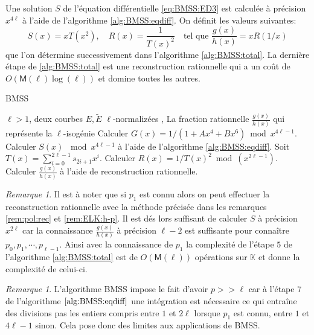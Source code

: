 \documentclass[10pt,a4paper]{book}
\theoremstyle{plain}
\theoremstyle{definition}
\theoremstyle{definition}
\theoremstyle{definition}
\theoremstyle{definition}
\theoremstyle{remark}
\newtheorem{rem}[thm]{Remarque}
\theoremstyle{remark}
\begin{document}
Une solution $S$ de l'équation différentielle \eqref{eq:BMSS:ED3} est calculée à précision $x^{4\ell}$ à l'aide de l'algorithme \ref{alg:BMSS:eqdiff}. On définit les valeurs suivantes:
\begin{equation}
S(x)=xT(x^2), \quad R(x)=\frac{1}{T(x)^2} \quad \text{tel que } \frac{g(x)}{h(x)}=xR(1/x)
\end{equation}
que l'on détermine successivement dans l'algorithme \ref{alg:BMSS:total}. La dernière étape de \ref{alg:BMSS:total} est une reconstruction rationnelle qui a un coût de $O(\mathsf{M}(\ell)\log(\ell))$ \cite[11]{vzGJG03} et domine toutes les autres.

\begin{algorithm}
\caption{\label{alg:BMSS:total} BMSS}
\begin{algorithmic}[1]
\REQUIRE $\ell>1$, deux courbes $E,\tilde{E}$ $\ell$-normalizées  ,%
\ENSURE La fraction rationnelle $\frac{g(x)}{h(x)}$ qui représente la $\ell$-isogénie
\STATE Calculer $G(x)=1/(1+Ax^4+Bx^6) \bmod x^{4\ell-1}$.
\STATE Calculer $S(x)$ $\bmod x^{4\ell-1}$ à l'aide de l'algorithme \ref{alg:BMSS:eqdiff}.
\STATE Soit $T(x)=\sum_{i=0}^{2\ell-1}s_{2i+1}x^i$.
\STATE Calculer $R(x)=1/T(x)^2 \bmod(x^{2\ell-1})$.
\STATE Calculer $\frac{g(x)}{h(x)}$ à l'aide de reconstruction rationnelle. 
\end{algorithmic}
\end{algorithm}

\begin{rem}
Il est à noter que si $p_1$ est connu alors on peut effectuer la reconstruction rationnelle avec la méthode  précisée dans les remarques \ref{rem:pol:rec} et \ref{rem:ELK:h-p}. Il est dés lors suffisant de calculer $S$ à précision $x^{2\ell}$ car la connaissance $\frac{g(x)}{h(x)}$ à précision $\ell-2$ est suffisante pour connaître $p_0,p_1,\cdots ,p_{\ell-1}$. Ainsi avec la connaissance de $p_1$ la complexité de l'étape $5$ de l'algorithme \ref{alg:BMSS:total} est de $O(\mathsf{M}(\ell))$ opérations sur $\mathbb{K}$ et donne la complexité de celui-ci.
\end{rem}

\begin{rem}
L'algorithme BMSS impose le fait d'avoir $p>>\ell$ car à l'étape $7$ de l'algorithme $\ref{alg:BMSS:eqdiff}$ une intégration est nécessaire ce qui entraîne des divisions pas les entiers compris entre $1$ et $2\ell$ lorsque $p_1$ est connu, entre $1$ et $4\ell-1$ sinon. Cela pose donc des limites aux applications de BMSS.
\end{rem}
\end{document}
